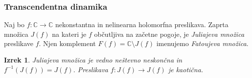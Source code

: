 \documentclass{beamer}
\newcommand{\CC}{\mathbb{C}}
\theoremstyle{definition}
\theoremstyle{plain}
\newtheorem{izrek}{Izrek}
\begin{document}
\begin{frame}
  \frametitle{Transcendentna dinamika}

  \begin{definition}
    Naj bo \(f \colon \CC \to \CC\) nekonstantna in nelinearna holomorfna preslikava. Zaprta množica \(J (f)\) na kateri je \(f\) občutljiva na začetne pogoje, je \emph{Juliajeva množica} preslikave \(f\). Njen komplement \(F (f) = \CC \setminus J(f)\) imenujemo \emph{Fatoujeva množica}.
  \end{definition}

  \pause

  \begin{izrek}
    Juliajeva množica je vedno neštevno neskončna in \(f^{-1} (J(f)) = J (f)\). Preslikava \(f \colon J(f) \to J(f)\) je kaotična.
  \end{izrek}
\end{frame}
\end{document}
